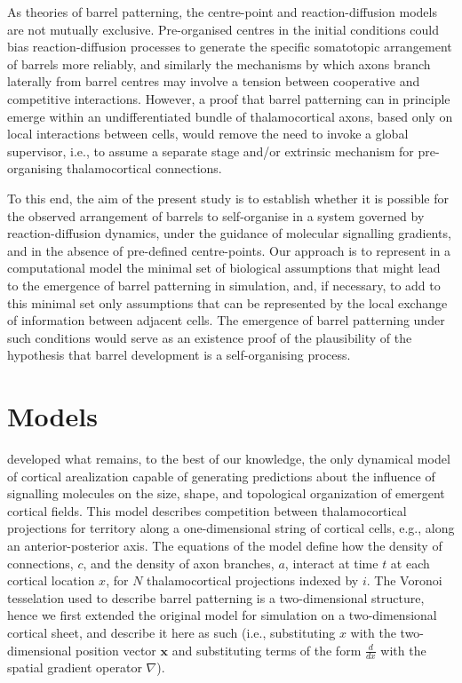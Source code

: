 \documentclass[a4paper,11pt]{article}
\newcommand{\mb}[1]{\mathbf{#1}}
\begin{document}
As theories of barrel patterning, the centre-point and reaction-diffusion
models are not mutually exclusive. Pre-organised centres in the initial
conditions could bias reaction-diffusion processes to generate the specific
somatotopic arrangement of barrels more reliably, and similarly the mechanisms
by which axons branch laterally from barrel centres may involve a tension
between cooperative and competitive interactions. However, a proof that barrel
patterning can in principle emerge within an undifferentiated bundle of
thalamocortical axons, based only on local interactions between cells, would
remove the need to invoke a global supervisor, i.e., to assume a separate
stage and/or extrinsic mechanism for pre-organising thalamocortical
connections.

To this end, the aim of the present study is to establish whether it is
possible for the observed arrangement of barrels to self-organise in a system
governed by reaction-diffusion dynamics, under the guidance of molecular
signalling gradients, and in the absence of pre-defined centre-points. Our
approach is to represent in a computational model the minimal set of
biological assumptions that might lead to the emergence of barrel patterning
in simulation, and, if necessary, to add to this minimal set only assumptions
that can be represented by the local exchange of information between adjacent
cells. The emergence of barrel patterning under such conditions would serve as
an existence proof of the plausibility of the hypothesis that barrel
development is a self-organising process.

\section*{Models}

\cite{karbowski_model_2004} developed what remains, to the best of our knowledge, the
only dynamical model of cortical arealization capable of generating
predictions about the influence of signalling molecules on the size, shape,
and topological organization of emergent cortical fields. This model describes
competition between thalamocortical projections for territory along a
one-dimensional string of cortical cells, e.g., along an anterior-posterior
axis. The equations of the model define how the density of connections, $c$,
and the density of axon branches, $a$, interact at time $t$ at each cortical
location $x$, for $N$ thalamocortical projections indexed by $i$. The Voronoi
tesselation used to describe barrel patterning is a two-dimensional structure,
hence we first extended the original model for simulation on a two-dimensional
cortical sheet, and describe it here as such (i.e., substituting $x$ with the
two-dimensional position vector $\mb{x}$ and substituting terms of the form
$\frac{d}{dx}$ with the spatial gradient operator $\nabla$).
\end{document}
